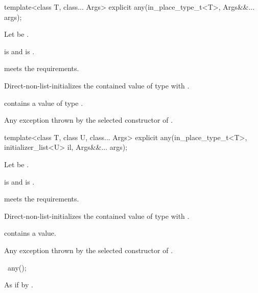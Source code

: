 %
\begin{itemdecl}
template<class T, class... Args>
  explicit any(in_place_type_t<T>, Args&&... args);
\end{itemdecl}

\begin{itemdescr}
\pnum
Let  be .

\pnum
\constraints
{} is  and
 is .

\pnum
\expects
{} meets the  requirements.

\pnum
\effects
Direct-non-list-initializes the contained value of type 
with .

\pnum
\ensures
{} contains a value of type .

\pnum
\throws
Any exception thrown by the selected constructor of .
\end{itemdescr}

%
\begin{itemdecl}
template<class T, class U, class... Args>
  explicit any(in_place_type_t<T>, initializer_list<U> il, Args&&... args);
\end{itemdecl}

\begin{itemdescr}
\pnum
Let  be .

\pnum
\constraints
{} is  and
 is .

\pnum
\expects
{} meets the  requirements.

\pnum
\effects
Direct-non-list-initializes the contained value of type 
with .

\pnum
\ensures
{} contains a value.

\pnum
\throws
Any exception thrown by the selected constructor of .
\end{itemdescr}

\begin{itemdecl}
~any();
\end{itemdecl}

\begin{itemdescr}
\pnum
\effects
As if by .
\end{itemdescr}

